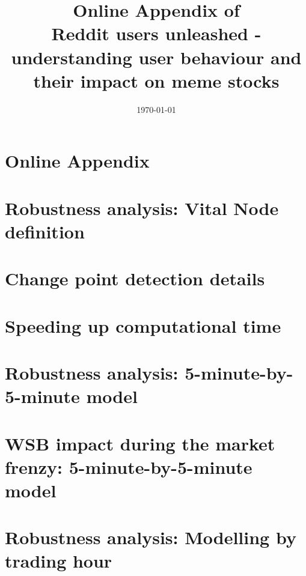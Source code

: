 \documentclass[11pt,a4paper,rorate,times]{article}
\title{	Online Appendix of \\ Reddit users unleashed - understanding user behaviour and their impact on meme stocks }
\author{ }
\date{\today}
\begin{document}
\maketitle

\section*{Online Appendix}
\appendix
{}
\section{Robustness analysis: Vital Node definition}
\label{app:vnrobust}


\section{Change point detection details}
\label{app:cpdetails}


\section{Speeding up computational time}
\label{app:computation}


\section{Robustness analysis: 5-minute-by-5-minute model}
\label{app:5minby5min}


\section{WSB impact during the market frenzy: 5-minute-by-5-minute model}
\label{app:5minfin}


\section{Robustness analysis: Modelling by trading hour}
\label{app:app_modelbyhour}


\newpage
\FloatBarrier
\printbibliography
\end{document}
